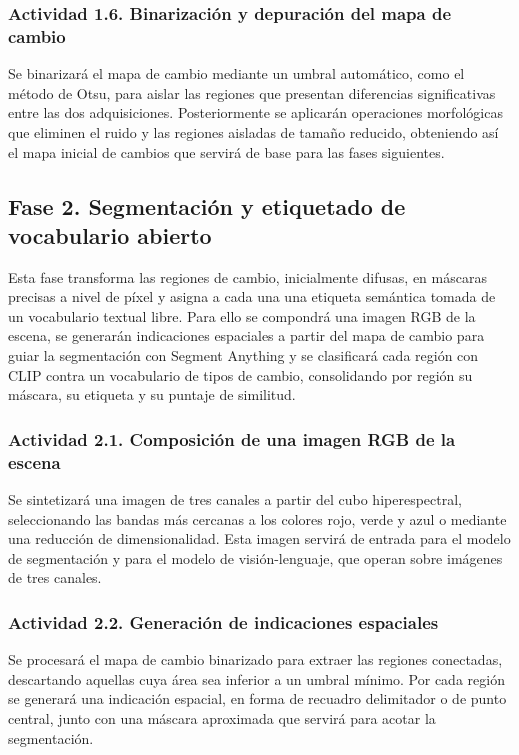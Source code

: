 \subsubsection{Actividad 1.6. Binarización y depuración del mapa de cambio}

Se binarizará el mapa de cambio mediante un umbral automático, como el método de Otsu, para aislar las regiones que presentan diferencias significativas entre las dos adquisiciones. Posteriormente se aplicarán operaciones morfológicas que eliminen el ruido y las regiones aisladas de tamaño reducido, obteniendo así el mapa inicial de cambios que servirá de base para las fases siguientes.

\subsection{Fase 2. Segmentación y etiquetado de vocabulario abierto}

Esta fase transforma las regiones de cambio, inicialmente difusas, en máscaras precisas a nivel de píxel y asigna a cada una una etiqueta semántica tomada de un vocabulario textual libre. Para ello se compondrá una imagen RGB de la escena, se generarán indicaciones espaciales a partir del mapa de cambio para guiar la segmentación con Segment Anything y se clasificará cada región con CLIP contra un vocabulario de tipos de cambio, consolidando por región su máscara, su etiqueta y su puntaje de similitud.

\subsubsection{Actividad 2.1. Composición de una imagen RGB de la escena}

Se sintetizará una imagen de tres canales a partir del cubo hiperespectral, seleccionando las bandas más cercanas a los colores rojo, verde y azul o mediante una reducción de dimensionalidad. Esta imagen servirá de entrada para el modelo de segmentación y para el modelo de visión-lenguaje, que operan sobre imágenes de tres canales.

\subsubsection{Actividad 2.2. Generación de indicaciones espaciales}

Se procesará el mapa de cambio binarizado para extraer las regiones conectadas, descartando aquellas cuya área sea inferior a un umbral mínimo. Por cada región se generará una indicación espacial, en forma de recuadro delimitador o de punto central, junto con una máscara aproximada que servirá para acotar la segmentación.


